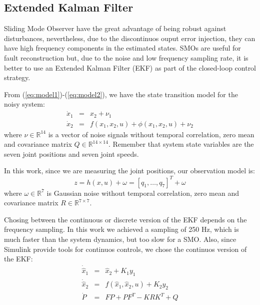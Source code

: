 \documentclass[a4paper, 10pt]{article}
\begin{document}
\subsection{Extended Kalman Filter}
Sliding Mode Observer have the great advantage of being robust against disturbances, nevertheless, due to the discontinuos ouput error injection, they can have high frequency components in the estimated states. SMOs are useful for fault reconstruction but, due to the noise and low frequency sampling rate, it is better to use an Extended Kalman Filter (EKF) as part of the closed-loop control strategy.

From (\ref{eq:model1})-(\ref{eq:model2}), we have the state transition model for the noisy system:
\begin{eqnarray}
    \dot{x}_1 &=& x_2 + \nu_1\label{eq:noisymodel1}\\
    \dot{x}_2 &=& f(x_1, x_2, u) + \phi(x_1, x_2, u) + \nu_2\label{eq:noisymodel2}
\end{eqnarray}
where $\nu \in\mathbb{R}^14$ is a vector of noise signals without temporal correlation, zero mean and covariance matrix $Q\in\mathbb{R}^{14\times 14}$. Remember that system state variables are the seven joint positions and seven joint speeds.

In this work, since we are measuring the joint positions, our observation model is:
\begin{equation}
  z = h(x,u) + \omega = [q_1,\dots,q_7]^T + \omega
  \label{eq:obsmodel}
\end{equation}
where $\omega\in\mathbb{R}^7$ is Gaussian noise without temporal correlation, zero mean and covariance matrix $R\in\mathbb{R}^{7\times 7}$.

Chosing between the continuous or discrete version of the EKF depends on the frequency sampling. In this work we achieved a sampling of 250 Hz, which is much faster than the system dynamics, but too slow for a SMO. Also, since Simulink provide tools for continuos controls, we chose the continuos version of the EKF:
\begin{eqnarray}
  \dot{\hat{x}}_1 &=& \hat{x}_2 + K_1 y_1 \label{eq:ekf1}\\
  \dot{\hat{x}}_2 &=& f(\hat{x}_1, \hat{x}_2, u) + K_2 y_2\label{eq:ekf2}\\
  \dot{P} &=& FP + PF^T - KRK^T + Q\label{eq:ekf3}
\end{eqnarray}
\end{document}
